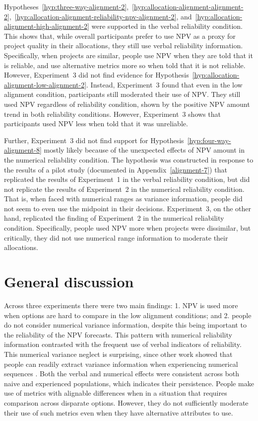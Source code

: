 \documentclass[a4paper, nobind, dvipsnames]{templates/ociamthesis}
\theoremstyle{definition}
\theoremstyle{definition}
\theoremstyle{definition}
\theoremstyle{definition}
\theoremstyle{remark}
\begin{document}
Hypotheses~\ref{hyp:three-way-alignment-2},~\ref{hyp:allocation-alignment-alignment-2},~\ref{hyp:allocation-alignment-reliability-npv-alignment-2},
and~\ref{hyp:allocation-alignment-high-alignment-2} were supported in the
verbal reliability condition. This shows that, while overall participants prefer
to use NPV as a proxy for project quality in their allocations, they still use
verbal reliability information. Specifically, when projects are similar, people
use NPV when they are told that it is reliable, and use alternative metrics more
so when told that it is not reliable. However, Experiment~3 did not find
evidence for Hypothesis~\ref{hyp:allocation-alignment-low-alignment-2}.
Instead, Experiment~3 found that even in the low alignment condition,
participants still moderated their use of NPV. They still used NPV regardless of
reliability condition, shown by the positive NPV amount trend in both
reliability conditions. However, Experiment~3 shows that participants used NPV
less when told that it was unreliable.

Further, Experiment~3 did not find support for
Hypothesis~\ref{hyp:four-way-alignment-8} mostly likely because of the
unexpected effects of NPV amount in the numerical reliability condition. The
hypothesis was constructed in response to the results of a pilot study
(documented in Appendix~\ref{alignment-7}) that replicated the results of
Experiment~1 in the verbal reliability condition, but did not replicate the
results of Experiment~2 in the numerical reliability condition. That is, when
faced with numerical ranges as variance information, people did not seem to even
use the midpoint in their decisions. Experiment~3, on the other hand, replicated
the finding of Experiment~2 in the numerical reliability condition.
Specifically, people used NPV more when projects were dissimilar, but
critically, they did not use numerical range information to moderate their
allocations.

\section{General discussion}

Across three experiments there were two main findings: 1. NPV is used more when
options are hard to compare in the low alignment conditions; and 2. people do
not consider numerical variance information, despite this being important to the
reliability of the NPV forecasts. This pattern with numerical reliability
information contrasted with the frequent use of verbal indicators of
reliability. This numerical variance neglect is surprising, since other work
showed that people can readily extract variance information when experiencing
numerical sequences \autocite{rosenbaum2020}. Both the verbal and numerical effects were
consistent across both naive and experienced populations, which indicates their
persistence. People make use of metrics with alignable differences when in a
situation that requires comparison across disparate options. However, they do
not sufficiently moderate their use of such metrics even when they have
alternative attributes to use.
\end{document}

